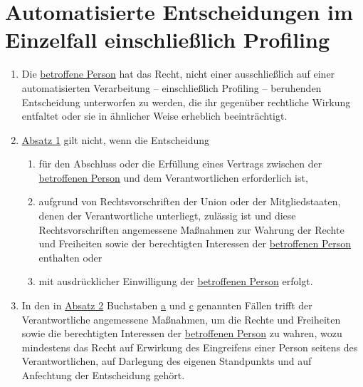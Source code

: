 \chapter{Automatisierte Entscheidungen im Einzelfall einschließlich Profiling}
\label{ch:22}


\begin{enumerate}

  \item Die \hyperref[itm:04-1]{betroffene Person} hat das Recht, nicht einer ausschließlich auf einer automatisierten Verarbeitung --
   einschließlich Profiling -- beruhenden Entscheidung unterworfen zu werden, die ihr gegenüber rechtliche Wirkung
   entfaltet oder sie in ähnlicher Weise erheblich beeinträchtigt.
  \label{itm:22-1}

  \item \hyperref[itm:22-1]{Absatz 1} gilt nicht, wenn die Entscheidung
  \label{itm:22-2}

  \begin{enumerate}
  
    \item für den Abschluss oder die Erfüllung eines Vertrags zwischen der \hyperref[itm:04-1]{betroffenen Person} und dem Verantwortlichen
     erforderlich ist,
    \label{itm:22-2a}

    \item aufgrund von Rechtsvorschriften der Union oder der Mitgliedstaaten, denen der Verantwortliche unterliegt,
     zulässig ist und diese Rechtsvorschriften angemessene Maßnahmen zur Wahrung der Rechte und Freiheiten sowie der
     berechtigten Interessen der \hyperref[itm:04-1]{betroffenen Person} enthalten oder
    \label{itm:22-2b}

    \item mit ausdrücklicher Einwilligung der \hyperref[itm:04-1]{betroffenen Person} erfolgt.
    \label{itm:22-2c}

  \end{enumerate}

  \item In den in \hyperref[itm:22-2]{Absatz 2} Buchstaben \hyperref[itm:22-2a]{a} und \hyperref[itm:22-2c]{c} genannten
   Fällen trifft der Verantwortliche angemessene Maßnahmen, um die Rechte und Freiheiten sowie die berechtigten
   Interessen der \hyperref[itm:04-1]{betroffenen Person} zu wahren, wozu mindestens das Recht auf Erwirkung des Eingreifens einer Person
   seitens des Verantwortlichen, auf Darlegung des eigenen Standpunkts und auf Anfechtung der Entscheidung gehört.
  \label{itm:22-3}


\end{enumerate}
